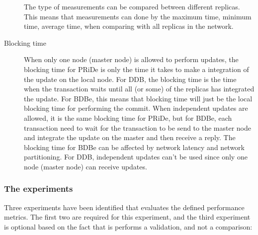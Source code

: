 \begin{description}
	The type of measurements can be compared between different replicas. This means that measurements can done by the maximum time, minimum time, average time, when comparing with all replicas in the network. 
	    
	 
	\item[Blocking time] 
	
	When only one node (master node) is allowed to perform updates, the blocking time for PRiDe is only the time it takes to make a integration of the update on the local node. For DDB, the blocking time is the time when the transaction waits until all (or some) of the replicas has integrated the update. For BDBe, this means that blocking time will just be the local blocking time for performing the commit.
	When independent updates are allowed, it is the same blocking time for PRiDe, but for BDBe, each transaction need to wait for the transaction to be send to the master node and integrate the update on the master and then receive a reply. The blocking time for BDBe can be affected by network latency and network partitioning. For DDB, independent updates can't be used since only one node (master node) can receive updates.
	
\end{description}


\subsubsection{The experiments} %
\label{ssub:the_experiments}

Three experiments have been identified that evaluates the defined performance metrics. The first two are required for this experiment, and the third experiment is optional based on the fact that is performs a validation, and not a comparison:

